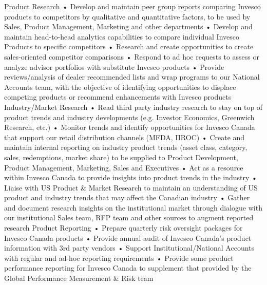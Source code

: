 \documentclass[footinclude, a4paper]{scrartcl}
\begin{document}
\begin{cv}{}
\begin{mycomments}
 Product Research
•	Develop and maintain peer group reports comparing Invesco products to competitors by qualitative and quantitative factors, to be used by Sales, Product Management, Marketing and other departments
•	Develop and maintain head-to-head analytics capabilities to compare individual Invesco Products to specific competitors
•	Research and create opportunities to create sales-oriented competitor comparisons
•	Respond to ad hoc requests to assess or analyze advisor portfolios with substitute Invesco products
•	Provide reviews/analysis of dealer recommended lists and wrap programs to our National Accounts team, with the objective of identifying opportunities to displace competing products or recommend enhancements with Invesco products
Industry/Market Research
•	Read third party industry research to stay on top of product trends and industry developments (e.g. Investor Economics, Greenwich Research, etc.)
•	Monitor trends and identify opportunities for Invesco Canada that support our retail  distribution channels (MFDA, IIROC)
•	Create and maintain internal reporting on industry product trends (asset class, category, sales, redemptions, market share) to be supplied to Product Development, Product Management, Marketing, Sales and Executives
•	Act as a resource within Invesco Canada to provide insights into product trends in the industry
•	Liaise with US Product & Market Research to maintain an understanding of US product and industry trends that may affect the Canadian industry
•	Gather and document research insights on the institutional market through dialogue with our institutional Sales team, RFP team and other sources to augment reported research
Product Reporting 
•	Prepare quarterly risk oversight packages for Invesco Canada products
•	Provide annual audit of Invesco Canada’s product information with 3rd party vendors
•	Support Institutional/National Accounts with regular and ad-hoc reporting requirements
•	Provide some product performance reporting for Invesco Canada to supplement that provided by the Global Performance Measurement & Risk team
\end{mycomments}



\end{cv}
\end{document}
